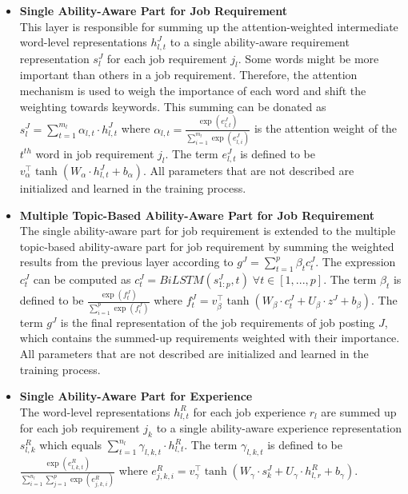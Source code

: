 \documentclass[draft,final]{thesisclass} %
\begin{document}
\begin{itemize}
\begin{itemize}
        \item \textbf{Single Ability-Aware Part for Job Requirement}\\
        This layer is responsible for summing up the attention-weighted intermediate word-level representations $h^J_{l,t}$ to a single ability-aware requirement representation $s^J_l$ for each job requirement $j_l$.
        Some words might be more important than others in a job requirement. Therefore, the attention mechanism is used to weigh the importance of each word and shift the weighting towards keywords.
        This summing can be donated as $s^J_l = \sum_{t=1}^{m_l} \alpha_{l,t} \cdot h^J_{l,t}$ where $\alpha_{l,t} = \frac{\exp(e^J_{l,t})}{\sum_{i=1}^{m_l} \exp(e^J_{l,i})}$ is the attention weight of the $t^{th}$ word in job requirement $j_l$.
        The term $e^J_{l,t}$ is defined to be $v_{\alpha}^{\intercal} \tanh(W_{\alpha} \cdot h^J_{l,t} + b_{\alpha})$.
        All parameters that are not described are initialized and learned in the training process.
        \item \textbf{Multiple Topic-Based Ability-Aware Part for Job Requirement}\\
        The single ability-aware part for job requirement is extended to the multiple topic-based ability-aware part for job requirement by summing the weighted results from the previous layer according to $g^J = \sum_{t=1}^p \beta_t c_t^J$.
        The expression $c_t^J$ can be computed as $c_t^J = BiLSTM(s^J_{1:p},t) \; \forall t \in [1,...,p]$.
        The term $\beta_t$ is defined to be $\frac{\exp(f^J_t)}{\sum_{i=1}^p \exp(f^J_i)}$ where $f^J_t = v_{\beta}^{\intercal} \tanh(W_{\beta} \cdot c_t^J + U_\beta \cdot z^J + b_{\beta})$.
        The term $g^J$ is the final representation of the job requirements of job posting $J$, which contains the summed-up requirements weighted with their importance.
        All parameters that are not described are initialized and learned in the training process.
        \item \textbf{Single Ability-Aware Part for Experience}\\
        The word-level representations $h^R_{l,t}$ for each job experience $r_l$ are summed up for each job requirement $j_k$ to a single ability-aware experience representation $s^R_{l,k}$ which equals $\sum_{t=1}^{n_l} \gamma_{l,k,t} \cdot h^R_{l,t}$.
        The term $\gamma_{l,k,t}$ is defined to be $\frac{\exp(e^R_{l,k,t})}{\sum_{i=1}^{n_l} \sum^p_{j=1} \exp(e^R_{j,k,i})}$ where $e^R_{j,k,i} = v_{\gamma}^{\intercal} \tanh(W_{\gamma} \cdot s^J_{k} + U_\gamma \cdot h^R_{l,r} + b_{\gamma})$.

\end{itemize}
\end{itemize}
\end{document}
